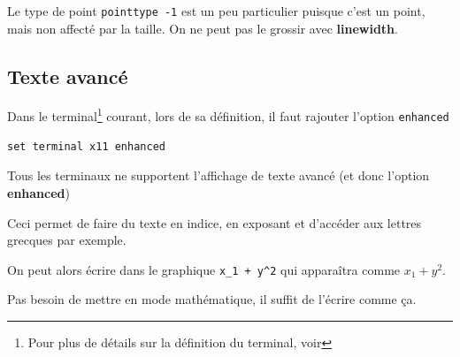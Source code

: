 \documentclass[a4paper,twoside]{article}
\begin{document}
\begin{attention}
Le type de point \texttt{pointtype -1} est un peu particulier puisque c'est un point, mais non affecté par la taille. On ne peut pas le grossir avec \textbf{linewidth}.
\end{attention}


\subsection{Texte avancé}\label{sec:enhanced}
Dans le terminal\footnote{Pour plus de détails sur la définition du terminal, voir } courant, lors de sa définition, il faut rajouter l'option \texttt{enhanced}

\begin{verbatim}
set terminal x11 enhanced
\end{verbatim}

\begin{attention}
Tous les terminaux ne supportent l'affichage de texte avancé (et donc l'option \textbf{enhanced})
\end{attention}


Ceci permet de faire du texte en indice, en exposant et d'accéder aux lettres grecques par exemple. 

On peut alors écrire dans le graphique \verb|x_1 + y^2| qui apparaîtra comme $x_1 + y^2$.

\begin{remarque}
Pas besoin de mettre en mode mathématique, il suffit de l'écrire comme ça.
\end{remarque}


\bigskip
\end{document}
